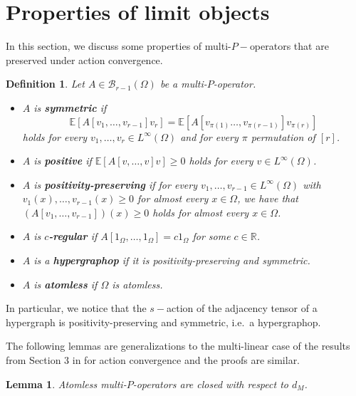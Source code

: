\documentclass[11pt]{article}
\newtheorem{lemma}[theorem]{Lemma}
\newtheorem{definition}[theorem]{Definition}
\def\E{\mathbb{E}}
\begin{document}
\section{Properties of limit objects}\label{SecPropLimObje}
In this section, we discuss some properties of multi-$P-$operators that are preserved under action convergence. 

\begin{definition}\label{defprops} Let $A\in\mathcal{B}_{r-1}(\Omega)$ be a multi-$P$-operator. 
\begin{itemize}
\item $A$ is {\bf symmetric} if $$\E[A[v_1,\ldots,v_{r-1}]v_r]=\E[A[v_{\pi(1)}\ldots,v_{\pi(r-1)}]v_{\pi(r)}]$$ holds for every $v_1,\ldots, v_{r}\in L^\infty(\Omega)$ and for every $\pi$ permutation of $[r]$.
\item $A$ is {\bf positive} if $\E[A[v,\ldots,v]v]\geq 0$ holds for every $v\in L^\infty(\Omega)$.
\item $A$ is {\bf positivity-preserving} if for every $v_1,\ldots,v_{r-1}\in L^\infty(\Omega)$ with $v_1(x),\ldots,v_{r-1}(x)\geq 0$ for almost every $x\in\Omega$, we have that $(A[v_1,\ldots,v_{r-1}])(x)\geq 0$ holds for almost every $x\in\Omega$.
\item $A$ is {\bf $c$-regular} if $ A[1_\Omega,\ldots,1_\Omega]=c1_\Omega$ for some $c\in\mathbb{R}$.
\item $A$ is a {\bf hypergraphop} if it is positivity-preserving and symmetric.%
\item $A$ is {\bf atomless} if $\Omega$ is atomless.
\end{itemize}
\end{definition}

In particular, we notice that the $s-$action of the adjacency tensor of a hypergraph is positivity-preserving and symmetric, i.e.\ a hypergraphop.

The following lemmas are generalizations to the multi-linear case of the results from Section 3 in \cite{backhausz2018action} for action convergence and the proofs are similar. 

\begin{lemma}Atomless multi-$P$-operators are closed with respect to $d_M$.
\end{lemma}
\end{document}
